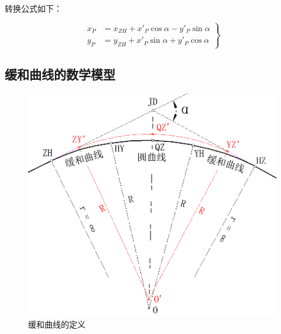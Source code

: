 转换公式如下：

\[
\left . \begin{aligned}
x_{P} &= x_{ZH} + x'_P \cos \alpha - y'_P \sin \alpha  \\
y_{P} &= y_{ZH} + x'_P \sin \alpha + y'_P \cos \alpha 
\end{aligned} \right \}
\]

 \subsection{缓和曲线的数学模型}

 \begin{figure}[htbp]
    \centering
    \includegraphics[scale=0.6]{route/HY01.png}
    \caption{缓和曲线的定义}
    \label{fig:HR01}
\end{figure}


